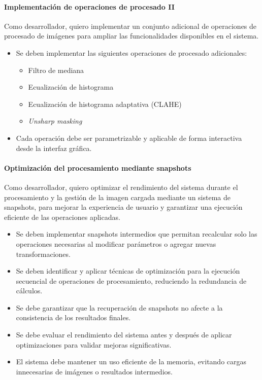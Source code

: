 \paragraph{Implementación de operaciones de procesado II} \label{hist:implementacion_operaciones_procesado_ii}
Como desarrollador, quiero implementar un conjunto adicional de operaciones de procesado de imágenes para ampliar 
las funcionalidades disponibles en el sistema.

\begin{itemize}[noitemsep]
	\item Se deben implementar las siguientes operaciones de procesado adicionales:
	\begin{itemize}[noitemsep]
		\item Filtro de mediana
		\item Ecualización de histograma
		\item Ecualización de histograma adaptativa (CLAHE)
		\item \textit{Unsharp masking}
	\end{itemize}
	\item Cada operación debe ser parametrizable y aplicable de forma interactiva desde la interfaz gráfica.
\end{itemize}

\newpage

\paragraph{Optimización del procesamiento mediante snapshots} \label{hist:optimizacion_rendimiento}
Como desarrollador, quiero optimizar el rendimiento del sistema durante el procesamiento y la gestión 
de la imagen cargada mediante un sistema de snapshots, para mejorar la experiencia de usuario y garantizar 
una ejecución eficiente de las operaciones aplicadas.

\begin{itemize}[noitemsep]
	\item Se deben implementar snapshots intermedios que permitan recalcular solo las operaciones necesarias al modificar parámetros o agregar nuevas transformaciones.
	\item Se deben identificar y aplicar técnicas de optimización para la ejecución secuencial de operaciones de procesamiento, reduciendo la redundancia de cálculos.
	\item Se debe garantizar que la recuperación de snapshots no afecte a la consistencia de los resultados finales.
	\item Se debe evaluar el rendimiento del sistema antes y después de aplicar optimizaciones para validar mejoras significativas.
	\item El sistema debe mantener un uso eficiente de la memoria, evitando cargas innecesarias de imágenes o resultados intermedios.
\end{itemize}

